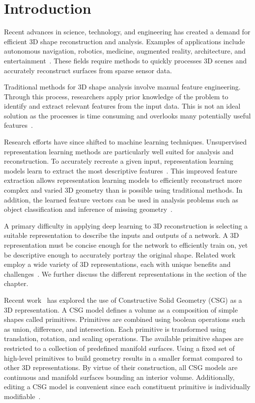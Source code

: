 
\chapter{Introduction}
\label{chap:introduction}

Recent advances in science, technology, and engineering has created a demand for efficient 3D shape reconstruction and analysis. Examples of applications include autonomous navigation, robotics, medicine, augmented reality, architecture, and entertainment~\cite{Xiao2020, Xie2022}. These fields require methods to quickly processes 3D scenes and accurately reconstruct surfaces from sparse sensor data.

Traditional methods for 3D shape analysis involve manual feature engineering. Through this process, researchers apply prior knowledge of the problem to identify and extract relevant features from the input data. This is not an ideal solution as the processes is time consuming and overlooks many potentially useful features~\cite{Bengio2013}.

Research efforts have since shifted to machine learning techniques. Unsupervised representation learning methods are particularly well suited for analysis and reconstruction. To accurately recreate a given input, representation learning models learn to extract the most descriptive features~\cite{Bengio2013}. This improved feature extraction allows representation learning models to efficiently reconstruct more complex and varied 3D geometry than is possible using traditional methods. In addition, the learned feature vectors can be used in analysis problems such as object classification and inference of missing geometry~\cite{Park2019}.

A primary difficulty in applying deep learning to 3D reconstruction is selecting a suitable representation to describe the inputs and outputs of a network. A 3D representation must be concise enough for the network to efficiently train on, yet be descriptive enough to accurately portray the original shape. Related work employ a wide variety of 3D representations, each with unique benefits and challenges~\cite{Xiao2020}. We further discuss the different representations in the  section of the  chapter.

Recent work~\cite{Sharma2018, Kania2020, Ren2021} has explored the use of Constructive Solid Geometry (CSG) as a 3D representation. A CSG model defines a volume as a composition of simple shapes called primitives. Primitives are combined using boolean operations such as union, difference, and intersection. Each primitive is transformed using translation, rotation, and scaling operations. The available primitive shapes are restricted to a collection of predefined manifold surfaces. Using a fixed set of high-level primitives to build geometry results in a smaller format compared to other 3D representations. By virtue of their construction, all CSG models are continuous and manifold surfaces bounding an interior volume. Additionally, editing a CSG model is convenient since each constituent primitive is individually modifiable~\cite{Hughes2013}.

